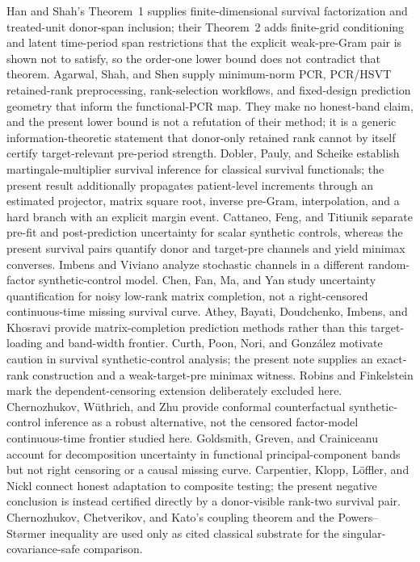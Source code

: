 \documentclass{article}
\begin{document}
Han and Shah's Theorem~1 supplies finite-dimensional survival factorization and treated-unit donor-span inclusion; their Theorem~2 adds finite-grid conditioning and latent time-period span restrictions that the explicit weak-pre-Gram pair is shown not to satisfy, so the order-one lower bound does not contradict that theorem. Agarwal, Shah, and Shen supply minimum-norm PCR, PCR/HSVT retained-rank preprocessing, rank-selection workflows, and fixed-design prediction geometry that inform the functional-PCR map. They make no honest-band claim, and the present lower bound is not a refutation of their method; it is a generic information-theoretic statement that donor-only retained rank cannot by itself certify target-relevant pre-period strength. Dobler, Pauly, and Scheike establish martingale-multiplier survival inference for classical survival functionals; the present result additionally propagates patient-level increments through an estimated projector, matrix square root, inverse pre-Gram, interpolation, and a hard branch with an explicit margin event. Cattaneo, Feng, and Titiunik separate pre-fit and post-prediction uncertainty for scalar synthetic controls, whereas the present survival pairs quantify donor and target-pre channels and yield minimax converses. Imbens and Viviano analyze stochastic channels in a different random-factor synthetic-control model. Chen, Fan, Ma, and Yan study uncertainty quantification for noisy low-rank matrix completion, not a right-censored continuous-time missing survival curve. Athey, Bayati, Doudchenko, Imbens, and Khosravi provide matrix-completion prediction methods rather than this target-loading and band-width frontier. Curth, Poon, Nori, and González motivate caution in survival synthetic-control analysis; the present note supplies an exact-rank construction and a weak-target-pre minimax witness. Robins and Finkelstein mark the dependent-censoring extension deliberately excluded here. Chernozhukov, Wüthrich, and Zhu provide conformal counterfactual synthetic-control inference as a robust alternative, not the censored factor-model continuous-time frontier studied here. Goldsmith, Greven, and Crainiceanu account for decomposition uncertainty in functional principal-component bands but not right censoring or a causal missing curve. Carpentier, Klopp, L\"offler, and Nickl connect honest adaptation to composite testing; the present negative conclusion is instead certified directly by a donor-visible rank-two survival pair. Chernozhukov, Chetverikov, and Kato's coupling theorem and the Powers--Størmer inequality are used only as cited classical substrate for the singular-covariance-safe comparison.
\end{document}
